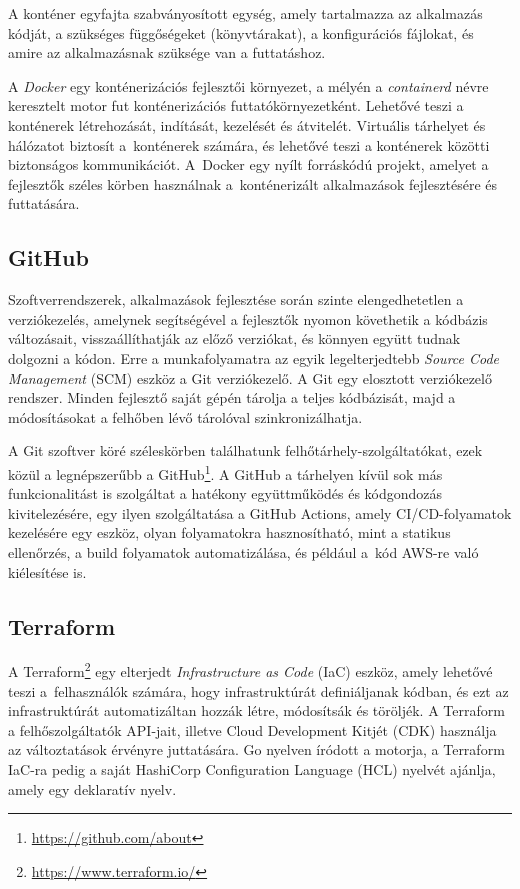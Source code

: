 A konténer egyfajta szabványosított egység, amely tartalmazza az alkalmazás kódját, a szükséges függőségeket (könyvtárakat), a konfigurációs fájlokat, és amire az alkalmazásnak szüksége van a futtatáshoz.

A \emph{Docker} egy konténerizációs fejlesztői környezet, a mélyén a \emph{containerd} névre keresztelt motor fut konténerizációs futtatókörnyezetként.\cite{Docker} Lehetővé teszi a konténerek létrehozását, indítását, kezelését és átvitelét. Virtuális tárhelyet és hálózatot biztosít a~konténerek számára, és lehetővé teszi a konténerek közötti biztonságos kommunikációt. A~Docker egy nyílt forráskódú projekt, amelyet a fejlesztők széles körben használnak a~konténerizált alkalmazások fejlesztésére és futtatására.

\subsection{GitHub}

Szoftverrendszerek, alkalmazások fejlesztése során szinte elengedhetetlen a verziókezelés, amelynek segítségével a fejlesztők nyomon követhetik a kódbázis változásait, visszaállíthatják az előző verziókat, és könnyen együtt tudnak dolgozni a kódon. Erre a munkafolyamatra az egyik legelterjedtebb \emph{Source Code Management} (SCM) eszköz a Git verziókezelő. A Git egy elosztott verziókezelő rendszer. Minden fejlesztő saját gépén tárolja a teljes kódbázisát, majd a módosításokat a felhőben lévő tárolóval szinkronizálhatja.

A Git szoftver köré széleskörben találhatunk felhőtárhely-szolgáltatókat, ezek közül a legnépszerűbb a GitHub\footnote{\url{https://github.com/about}}. A GitHub a tárhelyen kívül sok más funkcionalitást is szolgáltat a hatékony együttműködés és kódgondozás kivitelezésére, egy ilyen szolgáltatása a GitHub Actions, amely CI/CD-folyamatok kezelésére egy eszköz, olyan folyamatokra hasznosítható, mint a statikus ellenőrzés, a build folyamatok automatizálása, és például a~kód AWS-re való kiélesítése is.

\subsection{Terraform}

A Terraform\footnote{\url{https://www.terraform.io/}} egy elterjedt \emph{Infrastructure as Code} (IaC) eszköz, amely lehetővé teszi a~felhasználók számára, hogy infrastruktúrát definiáljanak kódban, és ezt az infrastruktúrát automatizáltan hozzák létre, módosítsák és töröljék. A Terraform a felhőszolgáltatók API-jait, illetve Cloud Development Kitjét (CDK) használja az változtatások érvényre juttatására. Go nyelven íródott a motorja, a Terraform IaC-ra pedig a saját HashiCorp Configuration Language (HCL) nyelvét ajánlja, amely egy deklaratív nyelv.
